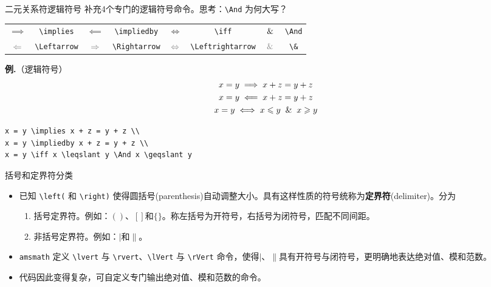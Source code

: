 \documentclass[mathserif]{beamer}
\providecommand{\gray}[2][0.5]{\textcolor[gray]{#1}{#2}}
\newcommand{\codegreen}[1]{\textcolor{codegreen}{#1}}
\newenvironment{instance}{\zihao{-5}\textbf{\songti \codegreen{例.}}}{\hfill\par}
\begin{document}
\begin{frame}[fragile]{二元关系符}{逻辑符号}
补充4个专门的逻辑符号命令。思考：\lstinline'\And' 为何大写？
\begin{table}[H]
\centering
\begin{tabular}{cc|cc|cc|cc}
	\toprule
	$\implies$ & \lstinline'\implies' & $\impliedby$ & \lstinline'\impliedby' & $\iff$ & \lstinline'\iff'& $\And$  & \lstinline'\And' \\
	$\gray{\Leftarrow}$ & \lstinline'\Leftarrow' & $\gray{\Rightarrow}$ & \lstinline'\Rightarrow' & $\gray{\Leftrightarrow}$ & \lstinline'\Leftrightarrow' & $\gray{\&}$  & \lstinline'\&' \\
	\bottomrule
\end{tabular}
\end{table}
\begin{instance}（逻辑符号）
\begin{equation*}
	\begin{gathered}
		x = y \implies x + z = y + z \\
		x = y \impliedby x + z = y + z \\
		x = y \iff x \leqslant y \And x \geqslant y
	\end{gathered}
\end{equation*}
\begin{lstlisting}[numbers=none]
x = y \implies x + z = y + z \\
x = y \impliedby x + z = y + z \\
x = y \iff x \leqslant y \And x \geqslant y
\end{lstlisting}
\end{instance}
\end{frame}

\begin{frame}[fragile]{括号和定界符}{分类}
\begin{itemize}

\item 已知 \lstinline'\left(' 和 \lstinline'\right)' 使得圆括号(parenthesis)自动调整大小。具有这样性质的符号统称为\textbf{\songti 定界符}(delimiter)。分为
	\begin{enumerate}[(1)]

	\item 括号定界符。例如：$()$、$[]$和$\{\}$。称左括号为开符号，右括号为闭符号\cite{LaTeX入门}，匹配不同间距。

	\item 非括号定界符。例如：$|$和$\|$。

\end{enumerate}

\item \verb'amsmath' 定义 \lstinline'\lvert' 与 \lstinline'\rvert'、\lstinline'\lVert' 与 \lstinline'\rVert' 命令，使得$|$、$\|$具有开符号与闭符号，更明确地表达绝对值、模和范数。

\item 代码因此变得复杂，可自定义专门输出绝对值、模和范数的命令。

\end{itemize}
\end{frame}
\end{document}
